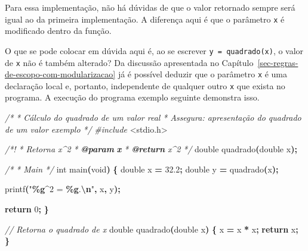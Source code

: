 \documentclass[
  11pt,
  a4paper,
]{scrbook}
\newenvironment{Shaded}{\begin{snugshade}}{\end{snugshade}}
\newcommand{\AnnotationTok}[1]{\textcolor[rgb]{0.56,0.35,0.01}{\textbf{\textit{#1}}}}
\newcommand{\CommentTok}[1]{\textcolor[rgb]{0.56,0.35,0.01}{\textit{#1}}}
\newcommand{\CommentVarTok}[1]{\textcolor[rgb]{0.56,0.35,0.01}{\textbf{\textit{#1}}}}
\newcommand{\ControlFlowTok}[1]{\textcolor[rgb]{0.13,0.29,0.53}{\textbf{#1}}}
\newcommand{\DataTypeTok}[1]{\textcolor[rgb]{0.13,0.29,0.53}{#1}}
\newcommand{\DecValTok}[1]{\textcolor[rgb]{0.00,0.00,0.81}{#1}}
\newcommand{\FloatTok}[1]{\textcolor[rgb]{0.00,0.00,0.81}{#1}}
\newcommand{\ImportTok}[1]{#1}
\newcommand{\NormalTok}[1]{#1}
\newcommand{\OperatorTok}[1]{\textcolor[rgb]{0.81,0.36,0.00}{\textbf{#1}}}
\newcommand{\PreprocessorTok}[1]{\textcolor[rgb]{0.56,0.35,0.01}{\textit{#1}}}
\newcommand{\SpecialCharTok}[1]{\textcolor[rgb]{0.81,0.36,0.00}{\textbf{#1}}}
\newcommand{\StringTok}[1]{\textcolor[rgb]{0.31,0.60,0.02}{#1}}
\begin{document}
Para essa implementação, não há dúvidas de que o valor retornado sempre
será igual ao da primeira implementação. A diferença aqui é que o
parâmetro \texttt{x} é modificado dentro da função.

O que se pode colocar em dúvida aqui é, ao se escrever
\texttt{y\ =\ quadrado(x)}, o valor de \texttt{x} não é também alterado?
Da discussão apresentada no
Capítulo~\ref{sec-regras-de-escopo-com-modularizacao} já é possível
deduzir que o parâmetro \texttt{x} é uma declaração local e, portanto,
independente de qualquer outro \texttt{x} que exista no programa. A
execução do programa exemplo seguinte demonstra isso.

\begin{Shaded}
\begin{Highlighting}[]
\CommentTok{/*}
\CommentTok{ * Cálculo do quadrado de um valor real}
\CommentTok{ * Assegura: apresentação do quadrado de um valor exemplo}
\CommentTok{ */}
\PreprocessorTok{\#include }\ImportTok{\textless{}stdio.h\textgreater{}}

\CommentTok{/*!}
\CommentTok{ * Retorna x\^{}2}
\CommentTok{ * }\AnnotationTok{@param}\CommentTok{ }\CommentVarTok{x}
\CommentTok{ * }\AnnotationTok{@return}\CommentTok{ x\^{}2}
\CommentTok{ */}
\DataTypeTok{double}\NormalTok{ quadrado}\OperatorTok{(}\DataTypeTok{double}\NormalTok{ x}\OperatorTok{);}

\CommentTok{/*}
\CommentTok{ * Main}
\CommentTok{ */}
\DataTypeTok{int}\NormalTok{ main}\OperatorTok{(}\DataTypeTok{void}\OperatorTok{)} \OperatorTok{\{}
    \DataTypeTok{double}\NormalTok{ x }\OperatorTok{=} \FloatTok{32.2}\OperatorTok{;}
    \DataTypeTok{double}\NormalTok{ y }\OperatorTok{=}\NormalTok{ quadrado}\OperatorTok{(}\NormalTok{x}\OperatorTok{);}

\NormalTok{    printf}\OperatorTok{(}\StringTok{"}\SpecialCharTok{\%g}\StringTok{\^{}2 = }\SpecialCharTok{\%g}\StringTok{.}\SpecialCharTok{\textbackslash{}n}\StringTok{"}\OperatorTok{,}\NormalTok{ x}\OperatorTok{,}\NormalTok{ y}\OperatorTok{);}

    \ControlFlowTok{return} \DecValTok{0}\OperatorTok{;}
\OperatorTok{\}}

\CommentTok{// Retorna o quadrado de x}
\DataTypeTok{double}\NormalTok{ quadrado}\OperatorTok{(}\DataTypeTok{double}\NormalTok{ x}\OperatorTok{)} \OperatorTok{\{}
\NormalTok{    x }\OperatorTok{=}\NormalTok{ x }\OperatorTok{*}\NormalTok{ x}\OperatorTok{;}
    \ControlFlowTok{return}\NormalTok{ x}\OperatorTok{;}
\OperatorTok{\}}
\end{Highlighting}
\end{Shaded}
\end{document}

